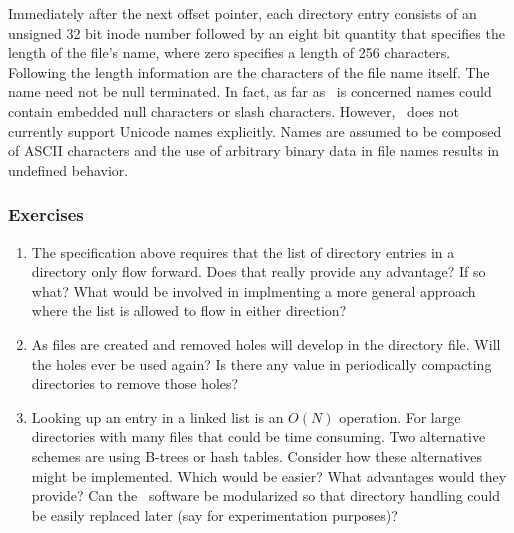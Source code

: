 Immediately after the next offset pointer, each directory entry consists of an unsigned 32 bit
inode number followed by an eight bit quantity that specifies the length of the file's name,
where zero specifies a length of 256 characters. Following the length information are the
characters of the file name itself. The name need not be null terminated. In fact, as far as
\GenericFS\ is concerned names could contain embedded null characters or slash characters.
However, \GenericFS\ does not currently support Unicode names explicitly. Names are assumed to
be composed of ASCII characters and the use of arbitrary binary data in file names results in
undefined behavior.

\subsubsection*{Exercises}

\begin{enumerate}

\item The specification above requires that the list of directory entries in a directory only
  flow forward. Does that really provide any advantage? If so what? What would be involved in
  implmenting a more general approach where the list is allowed to flow in either direction?

\item As files are created and removed holes will develop in the directory file. Will the holes
  ever be used again? Is there any value in periodically compacting directories to remove those
  holes?

\item Looking up an entry in a linked list is an $O(N)$ operation. For large directories with
  many files that could be time consuming. Two alternative schemes are using B-trees or hash
  tables. Consider how these alternatives might be implemented. Which would be easier? What
  advantages would they provide? Can the \GenericFS\ software be modularized so that directory
  handling could be easily replaced later (say for experimentation purposes)?

\end{enumerate}
